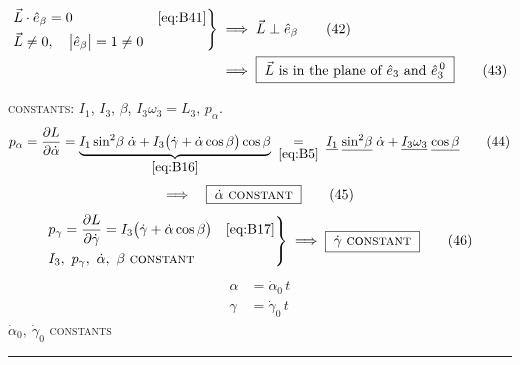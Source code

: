 \documentclass[11pt]{article}
\newcommand{\ehat}[1]{\hat{e}_{#1}}
\newcommand{\ezero}[1]{\hat{e}^{\,0}_{#1}}
\begin{document}
\begin{align*}
\left.\begin{aligned}
&\vec{L}\cdot\ehat{\beta} = 0 &&\eqref{eq:B41}\\
&\vec{L} \neq 0,\quad \bigl|\ehat{\beta}\bigr| = 1 \neq 0
\end{aligned}\right\}
\;&\Longrightarrow\;
\vec{L} \perp \ehat{\beta}
\tag{42}\label{eq:B42}\\
&\Longrightarrow\;
\boxed{\;\vec{L}\ \text{is in the plane of}\ \ehat{3}\ \text{and}\ \ezero{3}\;}
\tag{43}\label{eq:B43}
\end{align*}

\bigskip

\textsc{constants:} $I_1$, $I_3$, $\beta$, $I_3\omega_3 = L_3$, $p_\alpha$.
\begin{equation*}
p_\alpha = \frac{\partial L}{\partial \dot{\alpha}}
= \underbrace{I_1\sin^{2}\!\beta\;\dot{\alpha}
+ I_3\bigl(\dot{\gamma}+\dot{\alpha}\cos\beta\bigr)\cos\beta}_{\eqref{eq:B16}}
\;\underset{\eqref{eq:B5}}{=}\;
\underline{I_1}\;\underline{\sin^{2}\!\beta}\;\dot{\alpha} + \underline{I_3\omega_3}\;\underline{\cos\beta}
\tag{44}\label{eq:B44}
\end{equation*}
\begin{equation*}
\Longrightarrow\quad \boxed{\;\dot{\alpha}\ \textsc{constant}\;}
\tag{45}\label{eq:B45}
\end{equation*}
\begin{equation*}
\left.\begin{aligned}
&p_\gamma = \frac{\partial L}{\partial \dot{\gamma}} = I_3\bigl(\dot{\gamma}+\dot{\alpha}\cos\beta\bigr)
&&\eqref{eq:B17}\\
&I_3,\ p_\gamma,\ \dot{\alpha},\ \beta\ \textsc{constant}
\end{aligned}\right\}
\;\Longrightarrow\;
\boxed{\;\dot{\gamma}\ \textsc{constant}\;}
\tag{46}\label{eq:B46}
\end{equation*}
\begin{align*}
\alpha &= \dot{\alpha}_0\,t \tag{47}\label{eq:B47}\\
\gamma &= \dot{\gamma}_0\,t \tag{48}\label{eq:B48}
\end{align*}
\hfill $\dot{\alpha}_0,\ \dot{\gamma}_0$ \textsc{constants}

\bigskip\hrule\bigskip
\end{document}
